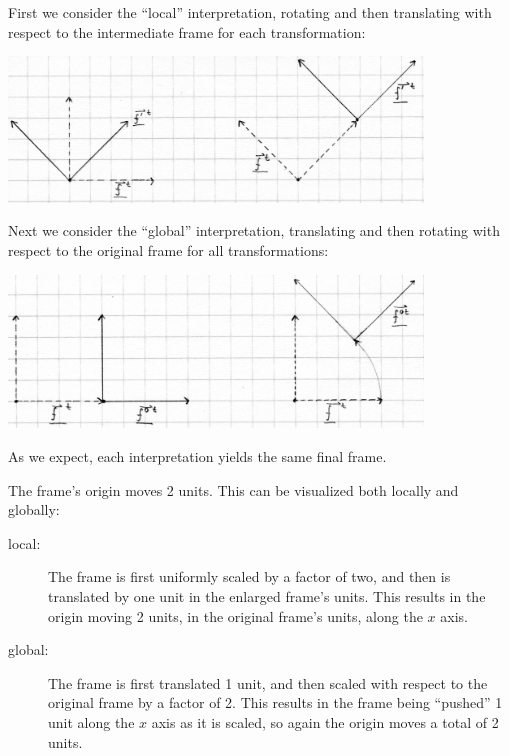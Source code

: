 \documentclass[11pt]{tingpset}
\begin{document}
  \makeheader

  First we consider the ``local'' interpretation, rotating and then translating with respect to the intermediate frame for each transformation:
  \begin{center}
    \includegraphics[width=11cm]{CS175_asst1_5_1a}
  \end{center}

  Next we consider the ``global'' interpretation, translating and then rotating with respect to the original frame for all transformations:
  \begin{center}
    \includegraphics[width=11cm]{CS175_asst1_5_1b}
  \end{center}

  As we expect, each interpretation yields the same final frame.

  The frame's origin moves 2 units. This can be visualized both locally and globally:
  \begin{description}
    \item[local:] The frame is first uniformly scaled by a factor of two, and then is translated by one unit in the enlarged frame's units. This results in the origin moving 2 units, in the original frame's units, along the $x$ axis.
    \item[global:] The frame is first translated 1 unit, and then scaled with respect to the original frame by a factor of 2. This results in the frame being ``pushed'' 1 unit along the $x$ axis as it is scaled, so again the origin moves a total of 2 units.
  \end{description}
\end{document}
